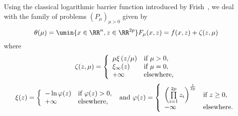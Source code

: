 Using the classical logarithmic barrier function introduced by Frish~\cite{frisch}, we deal with the family of problems $(P_\mu)_{\mu>0}$ given by
\begin{equation*}
\theta(\mu)=\umin{x\in\RR^n, z\in\RR^{2p}}
F_{\mu}(x,z)=f(x,z)+\zeta(z,\mu)
\end{equation*}
where $$\zeta(z,\mu)=\left\{\begin{array}{ll}
\mu \xi\left(z/\mu\right)&\mbox{if }\mu>0,\cr\xi_\infty(z)&\mbox{if }\mu=0,\cr+\infty&\mbox{elsewhere,}
\end{array}\right.$$ $$ \xi(z)=\left\{\begin{array}{ll}-\ln \varphi(z)&\mbox{if }\varphi(z)>0,\cr+\infty&\mbox{elsewhere,}\end{array}\right. \mbox{ and }\varphi(z)=\left\{\begin{array}{ll}\left(\prod\limits_{i=1}^{2p}z_i\right)^{1\over2p}&\mbox{if }z\geq0,\cr-\infty&\mbox{elsewhere.}\end{array}\right.$$


